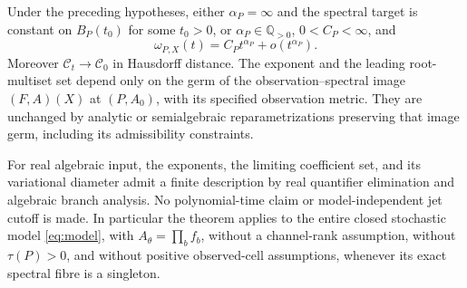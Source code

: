 \begin{theorem}\label{thm:germ-newton-v94}
Under the preceding hypotheses, either $\alpha_P=\infty$ and the
spectral target is constant on $B_P(t_0)$ for some $t_0>0$, or
$\alpha_P\in\mathbb Q_{>0}$, $0<C_P<\infty$, and
\begin{equation}\label{eq:germ-exact-v94}
 \omega_{P,X}(t)=C_Pt^{\alpha_P}+o(t^{\alpha_P}).
\end{equation}
Moreover $\mathcal C_t\to\mathcal C_0$ in Hausdorff distance.
The exponent and the leading root-multiset set depend only on the
germ of the observation--spectral image $(F,A)(X)$ at $(P,A_0)$,
with its specified observation metric. They are unchanged by
analytic or semialgebraic reparametrizations preserving that image
germ, including its admissibility constraints.

For real algebraic input, the exponents, the limiting coefficient
set, and its variational diameter admit a finite description by
real quantifier elimination and algebraic branch analysis. No
polynomial-time claim or model-independent jet cutoff is made.
In particular the theorem applies to the entire closed stochastic
model \eqref{eq:model}, with $A_\theta=\prod_b f_b$, without a
channel-rank assumption, without $\tau(P)>0$, and without positive
observed-cell assumptions, whenever its exact spectral fibre is a
singleton.
\end{theorem}
